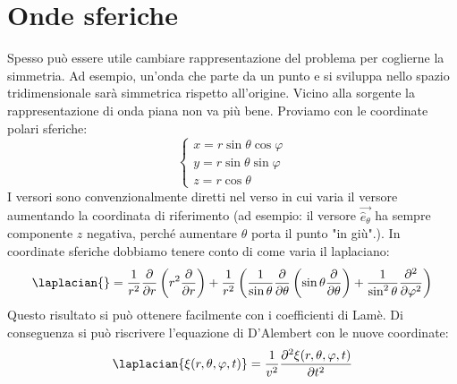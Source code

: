 
\section{Onde sferiche}
Spesso può essere utile cambiare rappresentazione del problema per coglierne la simmetria. Ad esempio, un'onda che parte da un punto e si sviluppa nello spazio tridimensionale sarà simmetrica rispetto all'origine. Vicino alla sorgente la rappresentazione di onda piana non va più bene. Proviamo con le coordinate polari sferiche:
\begin{equation}
	\begin{cases}
		x = r \sin\theta \cos\varphi \\
		y = r \sin \theta \sin \varphi \\
		z = r \cos \theta 
	\end{cases}
\end{equation}
I versori sono convenzionalmente diretti nel verso in cui varia il versore aumentando la coordinata di riferimento (ad esempio: il versore \(\vec{\hat{e}_\theta}\) ha sempre componente \(z\) negativa, perché aumentare \(\theta \) porta il punto "in giù".).
In coordinate sferiche dobbiamo tenere conto di come varia il laplaciano:
\begin{equation}
	\laplacian{} = \frac{1}{r^{2} } \frac{\partial }{\partial r} \left( r^{2} \frac{\partial }{\partial r}  \right)
	+ \frac{1}{r^{2} }\left( \frac{1}{\sin \theta } \frac{\partial }{\partial \theta } \left( \sin \theta \frac{\partial }{\partial \theta} \right) + \frac{1}{\sin ^{2} \theta } \frac{\partial ^{2} }{\partial \varphi ^{2} }   \right)     
\end{equation}
Questo risultato si può ottenere facilmente con i coefficienti di Lamè.
Di conseguenza si può riscrivere l'equazione di D'Alembert con le nuove coordinate:
\begin{equation}
	\laplacian{\xi (r,\theta ,\varphi ,t)}=\frac{1}{v^{2} }	\frac{\partial ^{2} \xi (r,\theta ,\varphi ,t)}{\partial t^{2} }  
\end{equation}
